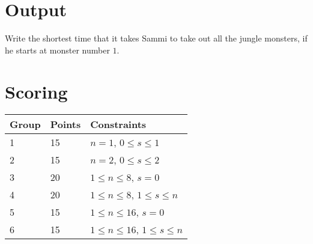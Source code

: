 \section*{Output}
Write the shortest time that it takes Sammi to take out all the jungle monsters, if he starts at monster number $1$.

\section*{Scoring}
\begin{tabular}{|l|l|l|}
\hline
Group & Points & Constraints \\ \hline
1     & 15   & $n = 1$, $0 \leq s \leq 1$ \\ \hline
2     & 15   & $n = 2$, $0 \leq s \leq 2$ \\ \hline
3     & 20   & $1 \leq n \leq 8$, $s = 0$ \\ \hline
4     & 20   & $1 \leq n \leq 8$, $1 \leq s \leq n$ \\ \hline
5     & 15   & $1 \leq n \leq 16$, $s = 0$ \\ \hline
6     & 15   & $1 \leq n \leq 16$, $1 \leq s \leq n$ \\ \hline
\end{tabular}

